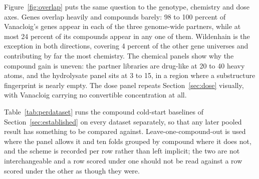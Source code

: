 Figure~\ref{fig:overlap} puts the same question to the genotype, chemistry and dose axes.
Genes overlap heavily and compounds barely: 98 to 100 percent of Vanacloig's genes appear in
each of the three genome-wide partners, while at most 24 percent of its compounds appear in
any one of them. Wildenhain is the exception in both directions, covering 4 percent of the
other gene universes and contributing by far the most chemistry. The chemical panels show why
the compound gain is uneven: the partner libraries are drug-like at 20 to 40 heavy atoms, and
the hydrolysate panel sits at 3 to 15, in a region where a substructure fingerprint is nearly
empty. The dose panel repeats Section~\ref{sec:dose} visually, with Vanacloig carrying no
convertible concentration at all.


Table~\ref{tab:perdataset} runs the compound cold-start baselines of
Section~\ref{sec:established} on every dataset separately, so that any later pooled result has
something to be compared against. Leave-one-compound-out is used where the panel allows it and
ten folds grouped by compound where it does not, and the scheme is recorded per row rather than
left implicit; the two are not interchangeable and a row scored under one should not be read
against a row scored under the other as though they were.

